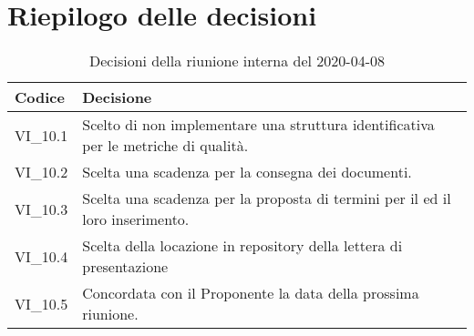 \section{Riepilogo delle decisioni}
\begin{longtable}{ 
	 >{\centering}p{} >{}p{} }
	
	\caption{Decisioni della riunione interna del 2020-04-08}\\	
	
	\textbf{\color{white}Codice} & 
	\textbf{\color{white}Decisione} 
	\tabularnewline  
	\endhead
	
	VI\_10.1 & Scelto di non implementare una struttura identificativa per le metriche di qualità. \\
	VI\_10.2 & Scelta una scadenza per la consegna dei documenti. \\
	VI\_10.3 & Scelta una scadenza per la proposta di termini per il \Glossario{} ed il loro inserimento. \\
	VI\_10.4 & Scelta della locazione in repository\ped{\textit{G}} della lettera di presentazione \\
	VI\_10.5 & Concordata con il Proponente\ped{\textit{G}} la data della prossima riunione.
	
\end{longtable}